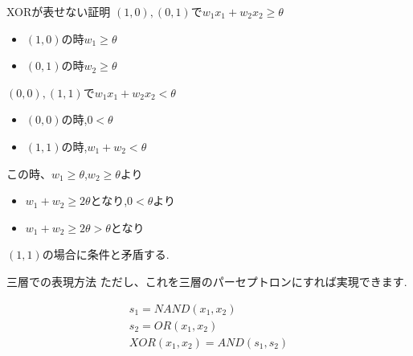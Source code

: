\begin{frame}[fragile]{XORが表せない証明}
$(1, 0),(0, 1)$で$w_1x_1 + w_2x_2 \ge \theta$
\begin{itemize}
    \item $(1, 0)$の時$w_1 \ge \theta$
    \item $(0, 1)$の時$w_2 \ge \theta$
\end{itemize}
$(0, 0),(1, 1)$で$w_1x_1 + w_2x_2 < \theta$
\begin{itemize}
\item $(0, 0)$の時,$0 < \theta$
\item $(1, 1)$の時,$w_1 + w_2 < \theta$
\end{itemize}

この時、$w_1 \ge \theta$,$w_2 \ge \theta$より
\begin{itemize}
\item $w_1 + w_2 \ge 2\theta$となり,$0 < \theta$より
\item $w_1 + w_2 \ge 2 \theta  > \theta$となり
\end{itemize}
$(1,1)$の場合に条件と矛盾する.
\end{frame}


\begin{frame}[fragile]{三層での表現方法}
ただし、これを三層のパーセプトロンにすれば実現できます.

\begin{equation*}
\begin{array}{ll}
s_1 =  NAND(x_1, x_2) \\
s_2 =  OR(x_1, x_2) \\
XOR(x_1, x_2) = AND(s_1, s_2)
\end{array}
\end{equation*}
\end{frame}


